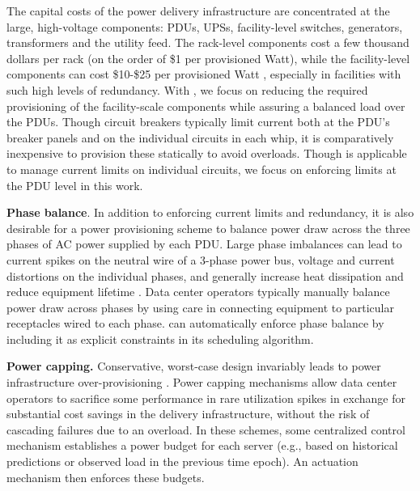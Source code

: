 The capital costs of the power delivery infrastructure are concentrated at the large, high-voltage components: PDUs, UPSs, facility-level switches, generators, transformers and the utility feed.  The rack-level components cost a few thousand dollars per rack (on the order of \$1 per provisioned Watt), while the facility-level components can cost \$10-\$25 per provisioned Watt \cite{BarrosoBook09,Turner06}, especially in facilities with such high levels of redundancy.  With \PowerRouting, we focus on reducing the required provisioning of the facility-scale components while assuring a balanced load over the PDUs.  Though circuit breakers typically limit current both at the PDU's breaker panels and on the individual circuits in each whip, it is comparatively inexpensive to provision these statically to avoid overloads.  Though \PowerRouting is applicable to manage current limits on individual circuits, we focus on enforcing limits at the PDU level in this work.

\textbf{Phase balance}. In addition to enforcing current limits and redundancy, it is also desirable for a power provisioning scheme to balance power draw across the three phases of AC power supplied by each PDU.  Large phase imbalances can lead to current spikes on the neutral wire of a 3-phase power bus, voltage and current distortions on the individual phases, and generally increase heat dissipation and reduce equipment lifetime \cite{Gruzs90}.  Data center operators typically manually balance power draw across phases by using care in connecting equipment to particular receptacles wired to each phase.  \PowerRouting can automatically enforce phase balance by including it as explicit constraints in its scheduling algorithm. 


\textbf{Power capping.} Conservative, worst-case design invariably leads to power infrastructure over-provisioning \cite{Govindan09,Ranganathan06,Fan07,Wang09}.  Power capping mechanisms allow data center operators to sacrifice some performance in rare utilization spikes in exchange for substantial cost savings in the delivery infrastructure, without the risk of cascading failures due to an overload. In these schemes, some centralized control mechanism establishes a power budget for each server (e.g., based on historical predictions or observed load in the previous time epoch).  An actuation mechanism then enforces these budgets.  

